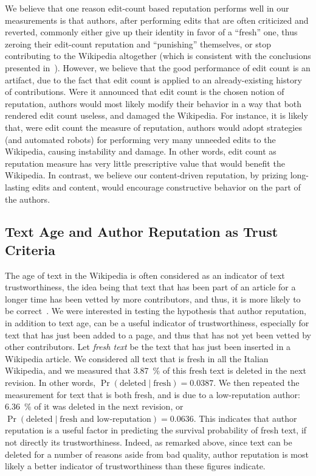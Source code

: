We believe that one reason edit-count based reputation performs well
in our measurements is that authors, after performing edits that are
often criticized and reverted, commonly either give up their identity
in favor of a ``fresh'' one, thus zeroing their edit-count reputation
and ``punishing'' themselves, or stop contributing to the Wikipedia
altogether (which is consistent with the conclusions presented
in~\cite{Halfaker2011}).
However, we believe that the good performance of edit count is an
artifact, due to the fact that edit count is applied to an
already-existing history of contributions.
Were it announced that edit count is the chosen notion of reputation,
authors would most likely modify their behavior in a way that both
rendered edit count useless, and damaged the Wikipedia.
For instance, it is likely that, were edit count the measure of
reputation, authors would adopt strategies (and automated robots) for
performing very many unneeded edits to the Wikipedia, causing
instability and damage.
In other words, edit count as reputation measure has very little
prescriptive value that would benefit the Wikipedia.
In contrast, we believe our content-driven reputation, by prizing
long-lasting edits and content, would encourage constructive behavior
on the part of the authors.

\subsection{Text Age and Author Reputation as Trust Criteria}

The age of text in the Wikipedia is often considered as an
indicator of text trustworthiness, the idea being that text that has
been part of an article for a longer time has been vetted by more
contributors, and thus, it is more likely to be correct~\cite{Cross2006}.
We were interested in testing the hypothesis that author reputation,
in addition to text age, can be a useful indicator of
trustworthiness, especially for text that has just been added to a
page, and thus that has not yet been vetted by other contributors.
Let {\em fresh text\/} be the text that has just been inserted in a
Wikipedia article.
We considered all text that is fresh in all the Italian
Wikipedia, and we measured that 3.87~\% of this fresh text is deleted
in the next revision.  In other words,
$\Pr(\mbox{deleted}\mid\mbox{fresh}) = 0.0387$.
We then repeated the measurement for text that is both fresh, and is
due to a low-reputation author: 6.36~\% of it was deleted in the next
revision, or
$\Pr(\mbox{deleted}\mid\mbox{fresh and low-reputation}) = 0.0636$.
This indicates that author reputation is a useful factor in predicting
the survival probability of fresh text, if not directly its
trustworthiness.
Indeed, as remarked above, since text can be deleted for a number of
reasons aside from bad quality, author reputation is most likely a
better indicator of trustworthiness than these figures indicate.


